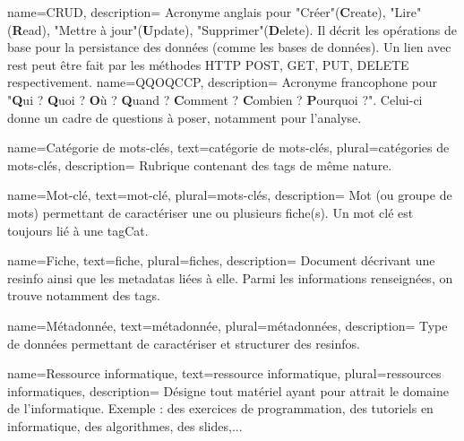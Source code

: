 {
    name={CRUD},
    description={
        Acronyme anglais pour "Créer"(\textbf{C}reate), "Lire" (\textbf{R}ead), "Mettre à jour"(\textbf{U}pdate), "Supprimer"(\textbf{D}elete). Il décrit les opérations de base pour la persistance des données (comme les bases de données). Un lien avec \Gls{rest} peut être fait par les méthodes HTTP POST, GET, PUT, DELETE respectivement.
    }
}
{
    name={QQOQCCP},
    description={
        Acronyme francophone pour "\textbf{Q}ui ? \textbf{Q}uoi ? \textbf{O}ù ? \textbf{Q}uand ? \textbf{C}omment ? \textbf{C}ombien ? \textbf{P}ourquoi ?". Celui-ci donne un cadre de questions à poser, notamment pour l'analyse.
    }
}

{
    name={Catégorie de mots-clés},
    text={catégorie de mots-clés},
    plural={catégories de mots-clés},
    description={
        Rubrique contenant des \glspl{tag} de même nature. 
    }
}

{
    name={Mot-clé},
    text={mot-clé},
    plural={mots-clés},
    description={
        Mot (ou groupe de mots) permettant de caractériser une ou plusieurs \gls{fiche}(s).
        Un mot clé est toujours lié à une \gls{tagCat}.
    }
}

{
    name={Fiche},
    text={fiche},
    plural={fiches},
    description={
        Document décrivant une \gls{resinfo} ainsi que les \glspl{metadata} liées à elle. Parmi les informations renseignées, on trouve notamment des \glspl{tag}.
    }
}

{
    name={Métadonnée},
    text={métadonnée},
    plural={métadonnées},
    description={
        Type de données permettant de caractériser et structurer des \glspl{resinfo}.
    }
}

{
    name={Ressource informatique},
    text={ressource informatique},
    plural={ressources informatiques},
    description={
        Désigne tout matériel ayant pour attrait le domaine de l'informatique. Exemple : des exercices de programmation, des tutoriels en informatique, des algorithmes, des slides,...
    }
}
